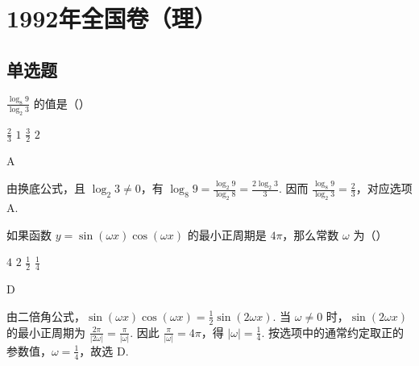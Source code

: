 \documentclass[UTF8,a4paper,oneside,11pt]{ctexbook}
\begin{document}
\mainmatter

\chapter{1992年全国卷（理）}
\section{单选题}

\begin{problem}
\(\frac{\log_8 9}{\log_2 3}\) 的值是（\quad）

\choices
    {\(\frac{2}{3}\)}
    {\(1\)}
    {\(\frac{3}{2}\)}
    {\(2\)}

\begin{answer}
A
\end{answer}

\begin{solution}
由换底公式，且 \(\log_2 3\neq0\)，有
\(\log_8 9=\frac{\log_2 9}{\log_2 8}=\frac{2\log_2 3}{3}\). 因而
\(\frac{\log_8 9}{\log_2 3}=\frac{2}{3}\)，对应选项 A.
\end{solution}
\end{problem}

\begin{problem}
如果函数 \(y=\sin(\omega x)\cos(\omega x)\) 的最小正周期是 \(4\pi\)，那么常数 \(\omega\) 为（\quad）

\choices
    {\(4\)}
    {\(2\)}
    {\(\frac{1}{2}\)}
    {\(\frac{1}{4}\)}

\begin{answer}
D
\end{answer}

\begin{solution}
由二倍角公式，\(\sin(\omega x)\cos(\omega x)=\frac{1}{2}\sin(2\omega x)\). 当 \(\omega\neq0\) 时，\(\sin(2\omega x)\) 的最小正周期为 \(\frac{2\pi}{|2\omega|}=\frac{\pi}{|\omega|}\). 因此
\(\frac{\pi}{|\omega|}=4\pi\)，得 \(|\omega|=\frac{1}{4}\). 按选项中的通常约定取正的参数值，\(\omega=\frac{1}{4}\)，故选 D.
\end{solution}
\end{problem}
\end{document}
